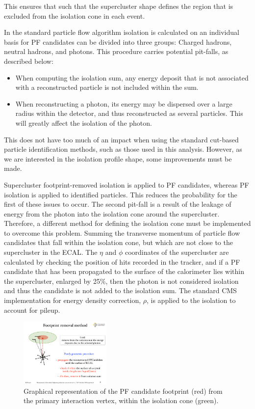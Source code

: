 This ensures that such that the supercluster shape defines the region that is excluded from the isolation cone in each event.

In the standard particle flow algorithm isolation is calculated on an individual basis for PF candidates can be divided into three groups: Charged hadrons, neutral hadrons, and photons. This procedure carries potential pit-falls, as described below:

\begin{itemize}
	\item When computing the isolation sum, any energy deposit that is not associated with a reconstructed particle is not included within the sum.  
	\item When reconstructing a photon, its energy may be dispersed over a large radius within the detector, and thus reconstructed as several particles. This will greatly affect the isolation of the photon.
\end{itemize}

This does not have too much of an impact when using the standard cut-based particle identification methods, such as those used in this analysis. However, as we are interested in the isolation profile shape, some improvements must be made. 

Supercluster footprint-removed isolation is applied to PF candidates, whereas PF isolation is applied to identified particles. This reduces the probability for the first of these issues to occur. The second pit-fall is a result of the leakage of energy from the photon into the isolation cone around the supercluster. Therefore, a different method for defining the isolation cone must be implemented to overcome this problem.  Summing the transverse momentum of particle flow candidates that fall within the isolation cone, but which are not close to the supercluster in the ECAL. The $\eta$ and $\phi$ coordinates of the supercluster are calculated by checking the position of hits recorded in the tracker, and if a PF candidate that has been propagated to the surface of the calorimeter lies within the supercluster, enlarged by 25\%, then the photon is not considered isolation and thus the candidate is not added to the isolation sum. The standard CMS implementation for energy density correction, $\rho$, is applied to the isolation to account for pileup. 

\begin{figure} 
\begin{center}
\includegraphics[width=0.4\textwidth]{Figures/RandomCone3.pdf}
\end{center}
\caption{Graphical representation of the PF candidate footprint (red) from the primary interaction vertex, within the isolation cone (green). \cite{MarcoThesis}}
\label{fig-SCFR}
\end{figure}

